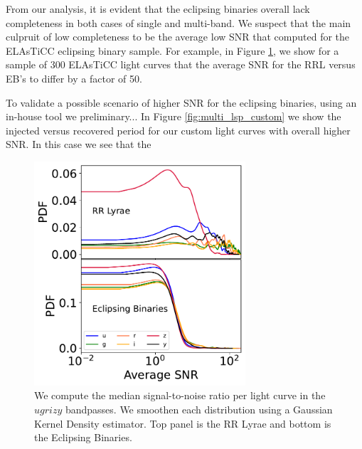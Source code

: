 \documentclass[DM,authoryear,toc]{lsstdoc}
\begin{document}
From our analysis, it is evident that the eclipsing binaries overall lack completeness in both cases of single and multi-band. We suspect that the main culpruit of low completeness to be the average low SNR that computed for the ELAsTiCC eclipsing binary sample. For example, in Figure \ref{fig:snr_average}, we show for a sample of 300 ELAsTiCC light curves that the average SNR for the RRL versus EB's to differ by a factor of 50. 

To validate a possible scenario of higher SNR for the eclipsing binaries, using an in-house tool we preliminary... In Figure \ref{fig:multi_lsp_custom} we show the injected versus recovered period for our custom light curves with overall higher SNR. In this case we see that the 

\begin{figure}
  \includegraphics[width=0.7\textwidth]{figures/snr_average.pdf}
  \centering 
  \caption{We compute the median signal-to-noise ratio per light curve in the $ugrizy$ bandpasses.  We smoothen each distribution using a Gaussian Kernel Density estimator. Top panel is the RR Lyrae and bottom is the Eclipsing Binaries. }
  \label{fig:snr_average}
\end{figure}
\end{document}
